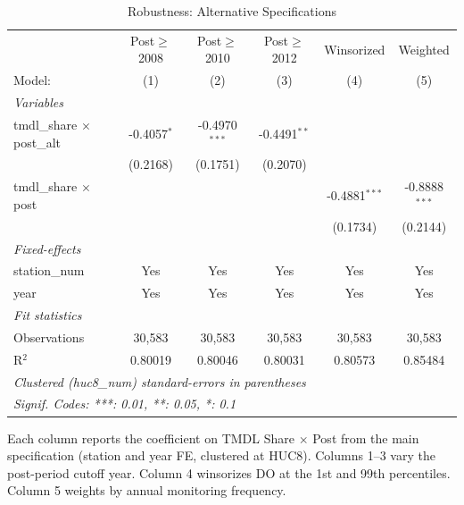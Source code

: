 
\begin{table}[htbp]
   \caption{\label{tab:robust} Robustness: Alternative Specifications}
   \centering
   \begin{tabular}{lccccc}
      \tabularnewline \midrule \midrule
                                        & Post$\geq$2008  & Post$\geq$2010  & Post$\geq$2012  & Winsorized      & Weighted \\   
      Model:                            & (1)             & (2)             & (3)             & (4)             & (5)\\  
      \midrule
      \emph{Variables}\\
      tmdl\_share $\times$ post\_alt    & -0.4057$^{*}$   & -0.4970$^{***}$ & -0.4491$^{**}$  &                 &   \\   
                                        & (0.2168)        & (0.1751)        & (0.2070)        &                 &   \\   
      tmdl\_share $\times$ post         &                 &                 &                 & -0.4881$^{***}$ & -0.8888$^{***}$\\   
                                        &                 &                 &                 & (0.1734)        & (0.2144)\\   
      \midrule
      \emph{Fixed-effects}\\
      station\_num                      & Yes             & Yes             & Yes             & Yes             & Yes\\  
      year                              & Yes             & Yes             & Yes             & Yes             & Yes\\  
      \midrule
      \emph{Fit statistics}\\
      Observations                      & 30,583          & 30,583          & 30,583          & 30,583          & 30,583\\  
      R$^2$                             & 0.80019         & 0.80046         & 0.80031         & 0.80573         & 0.85484\\  
      \midrule \midrule
      \multicolumn{6}{l}{\emph{Clustered (huc8\_num) standard-errors in parentheses}}\\
      \multicolumn{6}{l}{\emph{Signif. Codes: ***: 0.01, **: 0.05, *: 0.1}}\\
   \end{tabular}
   
   \par \raggedright 
   Each column reports the coefficient on TMDL Share $\times$ Post from the main specification (station and year FE, clustered at HUC8). Columns 1--3 vary the post-period cutoff year. Column 4 winsorizes DO at the 1st and 99th percentiles. Column 5 weights by annual monitoring frequency.
\end{table}


